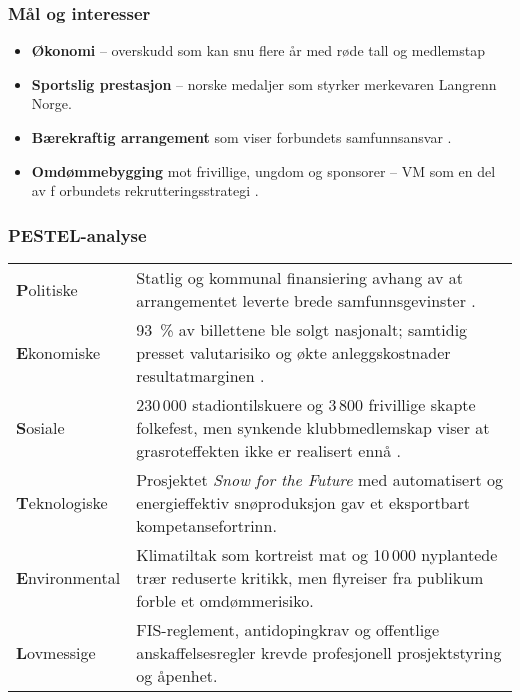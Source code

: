 \subsubsection*{Mål og interesser}

\begin{itemize}
    \item \textbf{Økonomi} -- overskudd som kan snu flere år med røde tall og
          medlemstap\cite{Adresseavisen}

    \item \textbf{Sportslig prestasjon} -- norske medaljer som styrker merkevaren Langrenn Norge.

    \item \textbf{Bærekraftig arrangement} som viser forbundets samfunnsansvar \cite{TrondheimKommuneVM}.
    \item \textbf{Omdømmebygging} mot frivillige, ungdom og sponsorer -- VM som en del av f
          orbundets rekrutteringsstrategi \cite{OsloVM}.
\end{itemize}

\subsubsection*{PESTEL-analyse}

\begin{table}[H]
    \centering
    \begin{tabular}{@{}p{2.7cm}p{10.2cm}@{}}
        \toprule                                                                                                                                                                                            \\ \midrule
        \textbf{P}olitiske     & Statlig og kommunal finansiering avhang av at arrangementet leverte brede samfunnsgevinster \cite{TrondheimKommuneVM}.                                                     \\
        \textbf{E}konomiske    & 93~\% av billettene ble solgt nasjonalt; samtidig presset valutarisiko og økte anleggskostnader resultatmarginen \cite{AdressaKjopefest}.                                  \\
        \textbf{S}osiale       & 230\,000 stadiontilskuere og 3\,800 frivillige skapte folkefest, men synkende klubbmedlemskap viser at grasroteffekten ikke er realisert ennå \cite{Adresseavisen,OsloVM}. \\
        \textbf{T}eknologiske  & Prosjektet \textit{Snow for the Future} med automatisert og energieffektiv snøproduksjon gav et eksportbart kompetansefortrinn\cite{Trondheim2025Sustainability}.          \\
        \textbf{E}nvironmental & Klimatiltak som kortreist mat og 10\,000 nyplantede trær reduserte kritikk, men flyreiser fra publikum forble et omdømmerisiko.                                            \\
        \textbf{L}ovmessige    & FIS-reglement, antidopingkrav og offentlige anskaffelsesregler krevde profesjonell prosjektstyring og åpenhet.                                                             \\ \bottomrule
    \end{tabular}
\end{table}

